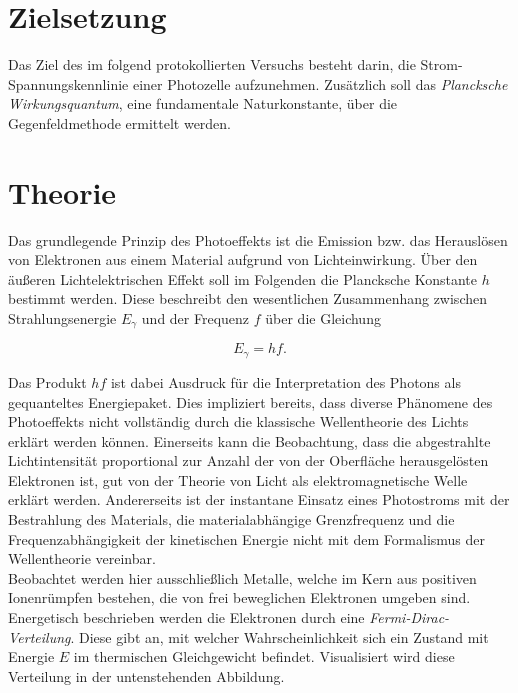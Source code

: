 



\section{Zielsetzung}
\label{sec:Zielsetzung}

Das Ziel des im folgend protokollierten Versuchs besteht darin, die Strom- Spannungskennlinie einer Photozelle aufzunehmen. Zusätzlich soll das \emph{Plancksche
Wirkungsquantum}, eine fundamentale Naturkonstante, über die Gegenfeldmethode ermittelt werden.

\section{Theorie}
\label{sec:Theorie}

Das grundlegende Prinzip des Photoeffekts ist die Emission bzw. das Herauslösen von Elektronen aus einem Material aufgrund von Lichteinwirkung. Über den äußeren 
Lichtelektrischen Effekt soll im Folgenden die Plancksche Konstante $h$ bestimmt werden. Diese beschreibt den wesentlichen Zusammenhang zwischen Strahlungsenergie
$E_\gamma$ und der Frequenz $f$ über die Gleichung 

\begin{equation*}
    E_\gamma = hf.
\end{equation*}

\noindent Das Produkt $hf$ ist dabei Ausdruck für die Interpretation des Photons als gequanteltes Energiepaket. Dies impliziert bereits, dass diverse Phänomene des 
Photoeffekts nicht vollständig durch die klassische Wellentheorie des Lichts erklärt werden können. Einerseits kann die Beobachtung, dass die abgestrahlte Lichtintensität 
proportional zur Anzahl der von der Oberfläche herausgelösten Elektronen ist, gut von der Theorie von Licht als elektromagnetische Welle erklärt werden. 
Andererseits ist der instantane Einsatz eines Photostroms mit der Bestrahlung des Materials, die materialabhängige Grenzfrequenz und die Frequenzabhängigkeit der 
kinetischen Energie nicht mit dem Formalismus der Wellentheorie vereinbar.\\

\noindent Beobachtet werden hier ausschließlich Metalle, welche im Kern aus positiven Ionenrümpfen bestehen, die von frei beweglichen Elektronen umgeben sind. Energetisch
beschrieben werden die Elektronen durch eine \emph{Fermi-Dirac-Verteilung}. Diese gibt an, mit welcher Wahrscheinlichkeit sich ein Zustand mit Energie $E$ im thermischen 
Gleichgewicht befindet. Visualisiert wird diese Verteilung in der untenstehenden Abbildung.

